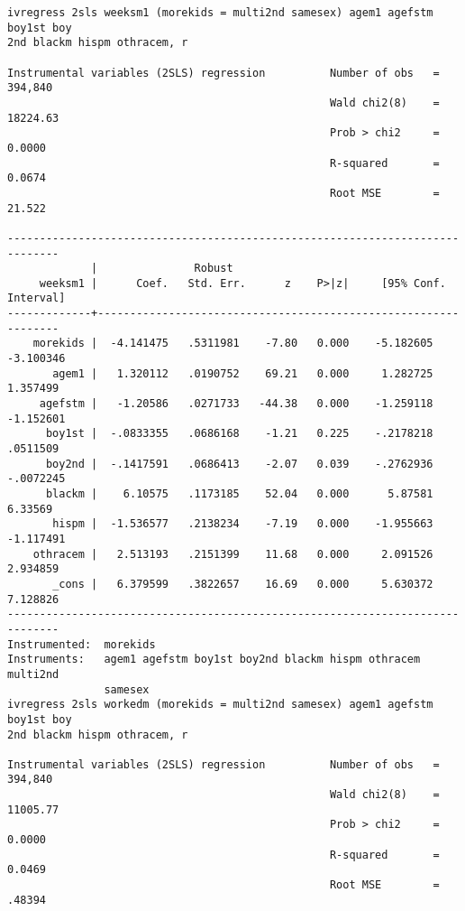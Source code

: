 \documentclass[11pt]{article}
\begin{document}
\begin{verbatim}
ivregress 2sls weeksm1 (morekids = multi2nd samesex) agem1 agefstm boy1st boy
2nd blackm hispm othracem, r

Instrumental variables (2SLS) regression          Number of obs   =    394,840
                                                  Wald chi2(8)    =   18224.63
                                                  Prob > chi2     =     0.0000
                                                  R-squared       =     0.0674
                                                  Root MSE        =     21.522

------------------------------------------------------------------------------
             |               Robust
     weeksm1 |      Coef.   Std. Err.      z    P>|z|     [95% Conf. Interval]
-------------+----------------------------------------------------------------
    morekids |  -4.141475   .5311981    -7.80   0.000    -5.182605   -3.100346
       agem1 |   1.320112   .0190752    69.21   0.000     1.282725    1.357499
     agefstm |   -1.20586   .0271733   -44.38   0.000    -1.259118   -1.152601
      boy1st |  -.0833355   .0686168    -1.21   0.225    -.2178218    .0511509
      boy2nd |  -.1417591   .0686413    -2.07   0.039    -.2762936   -.0072245
      blackm |    6.10575   .1173185    52.04   0.000      5.87581     6.33569
       hispm |  -1.536577   .2138234    -7.19   0.000    -1.955663   -1.117491
    othracem |   2.513193   .2151399    11.68   0.000     2.091526    2.934859
       _cons |   6.379599   .3822657    16.69   0.000     5.630372    7.128826
------------------------------------------------------------------------------
Instrumented:  morekids
Instruments:   agem1 agefstm boy1st boy2nd blackm hispm othracem multi2nd
               samesex
ivregress 2sls workedm (morekids = multi2nd samesex) agem1 agefstm boy1st boy
2nd blackm hispm othracem, r

Instrumental variables (2SLS) regression          Number of obs   =    394,840
                                                  Wald chi2(8)    =   11005.77
                                                  Prob > chi2     =     0.0000
                                                  R-squared       =     0.0469
                                                  Root MSE        =     .48394


\end{verbatim}
\end{document}
